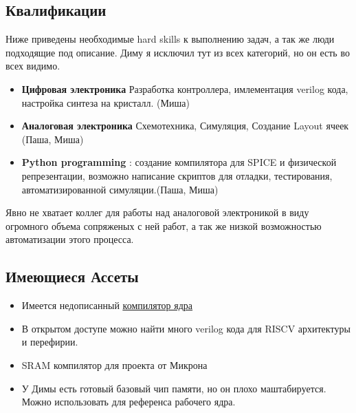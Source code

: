 \documentclass[a4paper,12pt]{article} %
\begin{document}
\subsection{Квалификации}

Ниже приведены необходимые  hard skills к выполнению задач, а так же люди подходящие под описание. Диму я исключил тут из всех категорий, но он есть во всех видимо.

\begin{itemize}
\item \textbf{Цифровая электроника} Разработка контроллера, имлементация verilog кода, настройка синтеза на кристалл. (Миша)
\item \textbf{Аналоговая электроника} Схемотехника, Симуляция, Создание Layout ячеек (Паша, Миша)
\item \textbf{Python programming} : создание компилятора для SPICE и физической репрезентации, возможно написание скриптов для отладки, тестирования, автоматизированной симуляции.(Паша, Миша)

\end{itemize}

Явно не хватает коллег для работы над аналоговой электроникой в виду огромного объема сопряженых с ней работ, а так же низкой возможностью автоматизации этого процесса.

\subsection{Имеющиеся Ассеты}

\begin{itemize}
\item Имеется недописанный \underline{\href{https://gitlab.com/mipt-ncs/nvram-gen}{компилятор ядра}}
\item В открытом доступе можно найти много verilog кода для RISCV архитектуры и перефирии.
\item SRAM компилятор для проекта от Микрона
\item У Димы есть готовый базовый чип памяти, но он плохо маштабируется. Можно использовать для референса  рабочего ядра. 


\end{itemize}
\end{document}
